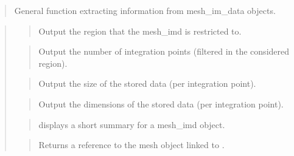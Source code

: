 \documentclass[a4paper,11pt,english]{sphinxmanual}
\begin{document}
\begin{quote}

General function extracting information from mesh\_im\_data objects.
\end{quote}

\begin{quote}

\begin{quote}

Output the region that the mesh\_imd is restricted to.
\end{quote}

\begin{quote}

Output the number of integration points (filtered in the considered region).
\end{quote}

\begin{quote}

Output the size of the stored data (per integration point).
\end{quote}

\begin{quote}

Output the dimensions of the stored data (per integration point).
\end{quote}

\begin{quote}

displays a short summary for a mesh\_imd object.
\end{quote}

\begin{quote}

Returns a reference to the mesh object linked to .
\end{quote}
\end{quote}
\end{document}
